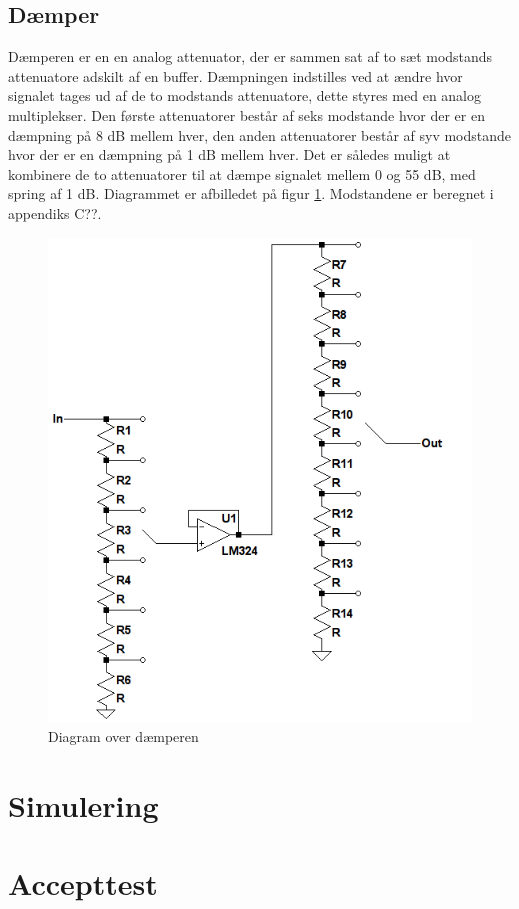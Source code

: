 \subsection*{Dæmper}
\label{volumenkontrol-simulering-daemper}
Dæmperen er en en analog attenuator, der er sammen sat af to sæt modstands attenuatore adskilt af en buffer. Dæmpningen indstilles ved at ændre hvor signalet tages ud af de to modstands attenuatore, dette styres med en analog multiplekser. Den første attenuatorer består af seks modstande hvor der er en dæmpning på 8 dB mellem hver, den anden attenuatorer består af syv modstande hvor der er en dæmpning på 1 dB mellem hver. Det er således muligt at kombinere de to attenuatorer til at dæmpe signalet mellem 0 og 55 dB, med spring af 1 dB. Diagrammet er afbilledet på figur \ref{fig:volumenkontrol_daemper}. Modstandene er beregnet i appendiks C??.

\begin{figure}[h]
\centering
\includegraphics[scale=1]{teknisk/volumenkontrol/daemper.png}
\caption{Diagram over dæmperen}
\label{fig:volumenkontrol_daemper}
\end{figure}

\section{Simulering}
\label{volumenkontrol-simulering}

\section{Accepttest}
\label{volumenkontrol-accepttest}

